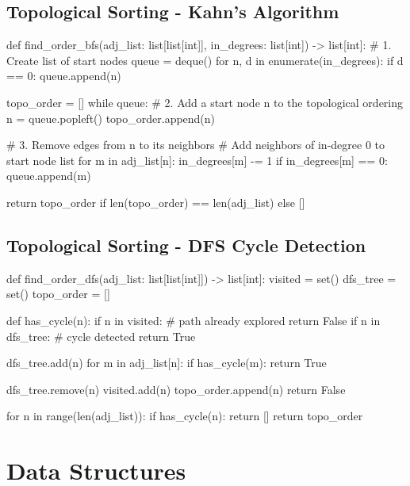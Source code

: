 \documentclass[12pt]{article}
\begin{document}
\subsection{Topological Sorting - Kahn's Algorithm}
\begin{python}
def find_order_bfs(adj_list: list[list[int]],
                   in_degrees: list[int]) -> list[int]:
    # 1. Create list of start nodes
    queue = deque()
    for n, d in enumerate(in_degrees):
        if d == 0:
            queue.append(n)

    topo_order = []
    while queue:
        # 2. Add a start node n to the topological ordering
        n = queue.popleft()
        topo_order.append(n)

        # 3. Remove edges from n to its neighbors
        #    Add neighbors of in-degree 0 to start node list
        for m in adj_list[n]:
            in_degrees[m] -= 1
            if in_degrees[m] == 0:
                queue.append(m)

    return topo_order if len(topo_order) == len(adj_list) else []
\end{python}

\subsection{Topological Sorting - DFS Cycle Detection}
\begin{python}
def find_order_dfs(adj_list: list[list[int]]) -> list[int]:
    visited = set()
    dfs_tree = set()
    topo_order = []

    def has_cycle(n):
        if n in visited:  # path already explored
            return False
        if n in dfs_tree:  # cycle detected
            return True

        dfs_tree.add(n)
        for m in adj_list[n]:
            if has_cycle(m):
                return True

        dfs_tree.remove(n)
        visited.add(n)
        topo_order.append(n)
        return False

    for n in range(len(adj_list)):
        if has_cycle(n):
            return []
    return topo_order
\end{python}

\section{Data Structures}
\end{document}
